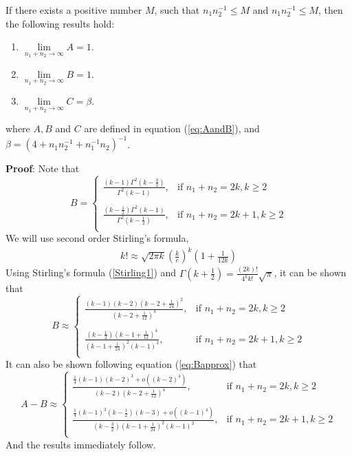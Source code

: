 	\begin{lemma}\label{lemmaLimit}
		If there exists a positive number $M$, such that  $n_1n_2^{-1}\leq M$ and $n_1n_2^{-1}\leq 
		M$, then the following results hold:
		\begin{enumerate}
			\item $\lim\limits_{n_1 + n_2\rightarrow \infty} A = 1$.
			\item $\lim\limits_{n_1 + n_2\rightarrow \infty} B = 1$.
			\item $\lim\limits_{n_1 + n_2\rightarrow \infty} C = \beta.$
		\end{enumerate}
		where  $A, B$ and $C$ are defined in equation (\ref{eq:AandB}), and $\beta= (4 + 
		n_1n_2^{-1} + n_1^{-1}n_2)^{-1}$. 
	\end{lemma}
	\textbf{Proof}: Note that 
	\begin{equation}
	B = 
	\begin{cases}
	\frac{(k-1)\Gamma^2(k- \frac{3}{2})}{\Gamma^2(k-1)},& \text{if } n_1 + n_2 = 2k, k\geq 2 \\
	~\\
	\frac{(k-\frac{1}{2})\Gamma^2(k- 1)}{\Gamma^2(k-\frac{1}{2})},& \text{if } n_1 + n_2 = 2k+1, 
	k\geq 2 \\
	\end{cases}
	\end{equation}
	We will use second order Stirling's formula,
	\begin{align}\label{Stirling1}
	k! \approx \sqrt{2\pi k}\left(\frac{k}{e}\right)^k(1 + \frac{1}{12k})
	\end{align}
	Using Stirling's formula (\ref{Stirling1}) and  $\Gamma(k + \frac{1}{2}) =
	\frac{(2k)!}{4^kk!}\sqrt{\pi}$, it can be shown that 
	\begin{equation}\label{eq:Bapprox}
	B \approx  
	\begin{cases}
	\frac{(k-1)(k-2)(k-2 + \frac{1}{24})^2}{(k-2 + \frac{1}{12})^4},& \text{if } n_1 + n_2 = 2k, 
	k\geq 2 \\
	~\\
	\frac{(k-\frac{1}{2})(k - 1 + \frac{1}{12})^4}{(k-1+ \frac{1}{24})^2(k-1)^3},& \text{if } n_1 + 
	n_2 = 2k+1, k\geq 2 \\
	\end{cases}
	\end{equation}
	It can also be shown following equation (\ref{eq:Bapprox}) that
	\begin{equation}\label{eq:AminusB}
	A- B \approx  
	\begin{cases}
	\frac{\frac{1}{4}(k-1)(k-2)^3 + o((k-2)^4)}{(k-2)(k-2 + \frac{1}{12})^4},& \text{if } n_1 + n_2 
	= 2k, k\geq 2 \\
	~\\
	\frac{\frac{1}{4}(k-1)^3(k-\frac{1}{2})(k-3) + o((k-1)^4)}{(k-\frac{3}{2})(k-1+ 
	\frac{1}{24})^2(k-1)^3},& \text{if } n_1 + n_2 = 2k+1, k\geq 2 \\
	\end{cases}
	\end{equation}
	And the results immediately follow.
	
